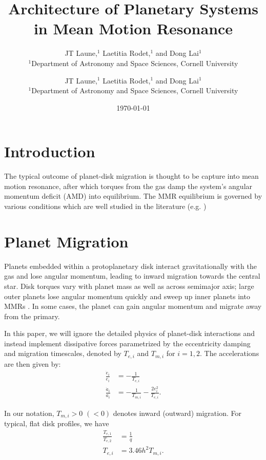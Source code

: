 \documentclass{mnras}
\author[Laune et al.]{
JT Laune,$^{1}$
Laetitia Rodet,$^{1}$
and Dong Lai$^{1}$
\\
$^{1}$Department of Astronomy and Space Sciences, Cornell University\\}
\date{\today}
\date{}
\title{}
\begin{document}
\tableofcontents

\title[MMR Architecture]{Architecture of Planetary Systems in Mean Motion Resonance}
\author[Laune et al.]{
JT Laune,$^{1}$
Laetitia Rodet,$^{1}$
and Dong Lai$^{1}$
\\
$^{1}$Department of Astronomy and Space Sciences, Cornell University\\}
\maketitle

\section{Introduction}
\label{sec:orgc0fd10a}
The typical outcome of planet-disk migration is thought to be capture
into mean motion resonance, after which torques from the gas damp the
system's angular momentum deficit (AMD) into equilibrium.  The MMR
equilibrium is governed by various conditions which are well studied
in the literature
(e.g. \cite{henrard_second_1983,deck_migration_2015,goldreich_overstable_2014,xu_migration_2018,henrard_second_1983})

\section{Planet Migration}
\label{sec:org4fb28d4}
Planets embedded within a protoplanetary disk interact gravitationally
with the gas and lose angular momentum, leading to inward migration
towards the central star.  Disk torques vary with planet mass as well
as across semimajor axis; large outer planets lose angular momentum
quickly and sweep up inner planets into MMRs
\cite{tanaka_three-dimensional_2004,xu_migration_2018}.  In some
cases, the planet can gain angular momentum and migrate away from the
primary.

In this paper, we will ignore the detailed physics of
planet-disk interactions and instead implement dissipative forces
parametrized by the eccentricity damping and migration timescales,
denoted by \(T_{e,i}\) and \(T_{m,i}\) for \(i=1,2\). The accelerations are
then given by:
\begin{align}\label{eq:disforce}
  \frac{\dot{e}_i}{e_i} &= -\frac{1}{T_{e,i}} \\
  \frac{\dot{a}_i}{a_i} &= -\frac{1}{T_{m,i}} -\frac{2e_i^2}{T_{e,i}}.
\end{align}

In our notation, \(T_{m,i}>0\) \((<0)\) denotes inward (outward)
migration.  For typical, flat disk profiles, we have
\cite{tanaka_three-dimensional_2004,cresswell_three-dimensional_2008,xu_migration_2018}
\begin{align}
  \frac{T_{e,1}}{T_{e,2}}&= \frac1q\\
  T_{e,i}&=3.46 h^2 T_{m,i}.
\end{align}
\end{document}
